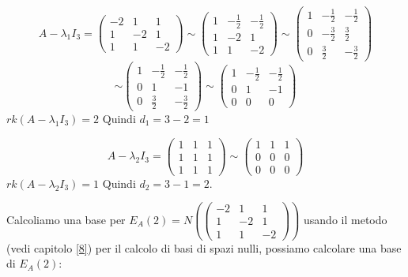 \documentclass[a4paper]{article}
\theoremstyle{break}
\theoremstyle{break}
\theoremstyle{break}
\theoremstyle{break}
\begin{document}
\begin{example}
\begin{enumerate}
      \[
        A - \lambda_1 I_3 = \begin{pmatrix} 
          -2 & 1 & 1\\
          1 & -2 & 1\\
          1 & 1 & -2
        \end{pmatrix}
        \sim
        \begin{pmatrix} 
          1 & -\frac{1}{2} & -\frac{1}{2}\\
          1 & -2 & 1\\
          1 & 1 & -2 
        \end{pmatrix}
        \sim
        \begin{pmatrix} 
          1 & -\frac{1}{2} & -\frac{1}{2}\\
          0 & -\frac{3}{2} & \frac{3}{2}\\
          0 & \frac{3}{2} & -\frac{3}{2}
        \end{pmatrix}
      \] 
      \[
      \sim
      \begin{pmatrix} 
        1 & -\frac{1}{2} & -\frac{1}{2}\\
        0 & 1 & -1\\
        0 & \frac{3}{2} & -\frac{3}{2}
      \end{pmatrix}
      \sim
      \begin{pmatrix} 
        1 & -\frac{1}{2} & -\frac{1}{2}\\
        0 & 1 & -1\\
        0 & 0 & 0
      \end{pmatrix}
      \] 
      \( rk(A - \lambda_1 I_3) = 2 \) Quindi \( d_1 = 3-2=1 \) 

      \vspace{1em}
      \[
      A - \lambda_2 I_3 = \begin{pmatrix} 
        1 & 1 & 1\\
        1 & 1 & 1\\
        1 & 1 & 1
      \end{pmatrix}
      \sim
      \begin{pmatrix} 
        1 & 1 & 1\\
        0 & 0 & 0\\
        0 & 0 & 0
      \end{pmatrix}
      \] 
      \( rk(A - \lambda_2 I_3) = 1 \) Quindi \( d_2 = 3-1 = 2 \).

      \vspace{2em}
      \noindent Calcoliamo una base per \( E_A(2) = N \left( \begin{pmatrix} 
          -2 & 1 & 1\\
          1 & -2 & 1\\
          1 & 1 & -2
      \end{pmatrix}  \right)  \) usando il metodo (vedi capitolo \ref{8}) per il calcolo
      di basi di spazi nulli, possiamo calcolare una base di \( E_A(2) \):


\end{enumerate}
\end{example}
\end{document}

